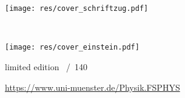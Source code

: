 \begin{titlepage}
	\begin{center}
		\vspace*{-1.25cm}
		{\LARGE
		\fibeltitel\par}

		\vspace{0.5cm}
		\texttt{[image: res/cover\_schriftzug.pdf]}

		{\huge
		\fibelsemester~\fibeljahr}

		\vspace{0.5cm}
		\texttt{[image: res/cover\_einstein.pdf]}
	\end{center}

	\LARGE
	limited edition \underline{\fontsize{32pt}{1em}}~/~140
	
	\vspace{1.9cm}
	\centering
	\url{https://www.uni-muenster.de/Physik.FSPHYS}
\end{titlepage}

